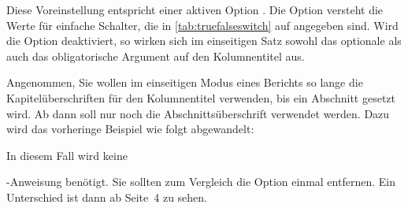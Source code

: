    Diese Voreinstellung entspricht einer aktiven Option
  . Die Option versteht
  die Werte für einfache Schalter, die in \autoref{tab:truefalseswitch} auf
   angegeben sind. Wird die Option
  deaktiviert, so wirken sich im einseitigen Satz sowohl das optionale als
  auch das obligatorische Argument auf den Kolumnentitel aus.%
  \IfThisCommonLabelBase{scrlayer-scrpage}{\iftrue}{\csname
    iffalse\endcsname}%
    \begin{Example}
      Angenommen, Sie wollen im einseitigen Modus eines Berichts %
      \iffalse %
      eine ganz ähnliche Verwendung des Kolumnentitels erreichen wie im
      vorherigen Beispiel. Konkret soll so lange die Kapitelüberschrift
      verwendet werden, %
      \else %
      so lange die Kapitelüberschriften für den Kolumnentitel verwenden, %
      \fi %
      bis ein Abschnitt gesetzt wird. Ab dann soll nur noch die
      Abschnittsüberschrift verwendet werden. %
      \iftrue %
      Dazu wird das %
      \iftrue vorheringe \fi %
      Beispiel wie folgt abgewandelt:%
      \fi %
      \iffalse %
      Wie zu sehen ist, wird in diesem Fall keine %
      \else %
      In diesem Fall wird keine %
      \fi
      \iffalse ergänzende \fi %
      -Anweisung benötigt. Sie sollten zum
      Vergleich die Option  %
      \iffalse auch \fi %
      einmal %
      \iffalse auf \PValue{true} setzen oder sie \fi %
      entfernen. Ein Unterschied ist dann ab Seite~4 %
      \iffalse im Kolumnentitel im Kopf der Seiten \fi %
      zu sehen.
    \end{Example}
  \fi

